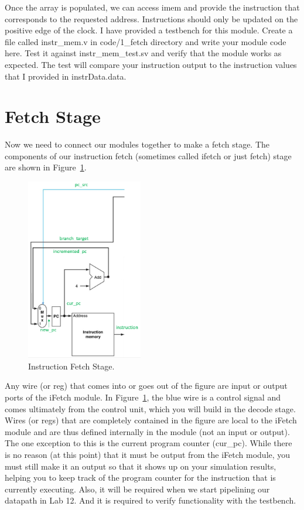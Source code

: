 Once the array is populated, we can access imem and provide the instruction that corresponds to the requested address.  Instructions should only be updated on the positive edge of the clock.  I have provided a testbench for this module.  Create a file called instr\_mem.v in code/1\_fetch directory and write your module code here.  Test it against instr\_mem\_test.sv and verify that the module works as expected.  The test will compare your instruction output to the instruction values that I provided in instrData.data. 

\section{Fetch Stage}
Now we need to connect our modules together to make a fetch stage.  The components of our instruction fetch (sometimes called ifetch or just fetch) stage are shown in Figure~\ref{fig:fetch}.

\begin{figure}
\caption{Instruction Fetch Stage.}\label{fig:fetch}
\begin{center}
\includegraphics[width=2in]{../images/pipeline_fetch.png}
\end{center}
\end{figure}

Any wire (or reg) that comes into or goes out of the figure are input or output ports of the iFetch module.  In Figure~\ref{fig:fetch}, the blue wire is a control signal and comes ultimately from the control unit, which you will build in the decode stage.   Wires (or regs) that are completely contained in the figure are local to the iFetch module and are thus defined internally in the module (not an input or output).  The one exception to this is the current program counter (cur\_pc).  While there is no reason (at this point) that it must be output from the iFetch module, you must still make it an output so that it shows up on your simulation results, helping you to keep track of the program counter for the instruction that is currently executing.  Also, it will be required when we start pipelining our datapath in Lab 12.  And it is required to verify functionality with the testbench.

